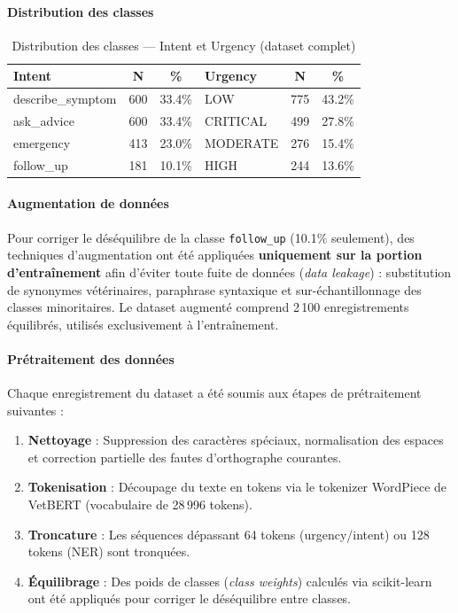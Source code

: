 \paragraph{Distribution des classes}

\begin{table}[H]
\centering
\caption{Distribution des classes — Intent et Urgency (dataset complet)}
\label{tab:class-dist}
\renewcommand{\arraystretch}{1.4}
\begin{tabular}{|l|c|c||l|c|c|}
\hline
\textbf{Intent} & \textbf{N} & \textbf{\%} &
\textbf{Urgency} & \textbf{N} & \textbf{\%} \\
\hline
describe\_symptom & 600 & 33.4\% & LOW      & 775 & 43.2\% \\
ask\_advice       & 600 & 33.4\% & CRITICAL & 499 & 27.8\% \\
emergency         & 413 & 23.0\% & MODERATE & 276 & 15.4\% \\
follow\_up        & 181 & 10.1\% & HIGH     & 244 & 13.6\% \\
\hline
\end{tabular}
\end{table}

\paragraph{Augmentation de données}

Pour corriger le déséquilibre de la classe \texttt{follow\_up} (10.1\% seulement), des techniques d'augmentation ont été appliquées \textbf{uniquement sur la portion d'entraînement} afin d'éviter toute fuite de données (\textit{data leakage}) : substitution de synonymes vétérinaires, paraphrase syntaxique et sur-échantillonnage des classes minoritaires. Le dataset augmenté comprend 2\,100 enregistrements équilibrés, utilisés exclusivement à l'entraînement.

\paragraph{Prétraitement des données}

Chaque enregistrement du dataset a été soumis aux étapes de prétraitement suivantes :

\begin{enumerate}
    \item \textbf{Nettoyage} : Suppression des caractères spéciaux, normalisation des espaces et correction partielle des fautes d'orthographe courantes.

    \item \textbf{Tokenisation} : Découpage du texte en tokens via le tokenizer WordPiece de VetBERT (vocabulaire de 28\,996 tokens).

    \item \textbf{Troncature} : Les séquences dépassant 64 tokens (urgency/intent) ou 128 tokens (NER) sont tronquées.

    \item \textbf{Équilibrage} : Des poids de classes (\textit{class weights}) calculés via scikit-learn ont été appliqués pour corriger le déséquilibre entre classes.
\end{enumerate}

